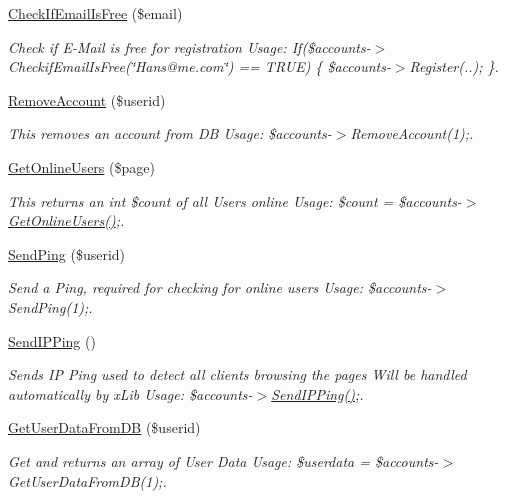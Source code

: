 \begin{DoxyCompactItemize}
\hyperlink{class_u_e4_a_m___account_handler_a64d6faff7acdf23772820fb5a54b53b1}{Check\-If\-Email\-Is\-Free} (\$email)
\begin{DoxyCompactList}\small\item\em Check if E-\/\-Mail is free for registration Usage\-: If(\$accounts-\/$>$Checkif\-Email\-Is\-Free(\char`\"{}\-Hans@me.\-com\char`\"{}) == T\-R\-U\-E) \{ \$accounts-\/$>$Register(..); \}. \end{DoxyCompactList}\item 
\hyperlink{class_u_e4_a_m___account_handler_a24079ae9534790d1f6b99cd1ea184a63}{Remove\-Account} (\$userid)
\begin{DoxyCompactList}\small\item\em This removes an account from D\-B Usage\-: \$accounts-\/$>$Remove\-Account(1);. \end{DoxyCompactList}\item 
\hyperlink{class_u_e4_a_m___account_handler_acd1ece5e2413a2422d27e6ce768f767e}{Get\-Online\-Users} (\$page)
\begin{DoxyCompactList}\small\item\em This returns an int \$count of all Users online Usage\-: \$count = \$accounts-\/$>$\hyperlink{class_u_e4_a_m___account_handler_acd1ece5e2413a2422d27e6ce768f767e}{Get\-Online\-Users()};. \end{DoxyCompactList}\item 
\hyperlink{class_u_e4_a_m___account_handler_a1908680a6760b1256fb20959f0d11ae7}{Send\-Ping} (\$userid)
\begin{DoxyCompactList}\small\item\em Send a Ping, required for checking for online users Usage\-: \$accounts-\/$>$Send\-Ping(1);. \end{DoxyCompactList}\item 
\hyperlink{class_u_e4_a_m___account_handler_a36c70407684b1436a2f5e56deb0c7953}{Send\-I\-P\-Ping} ()
\begin{DoxyCompactList}\small\item\em Sends I\-P Ping used to detect all clients browsing the pages Will be handled automatically by x\-Lib Usage\-: \$accounts-\/$>$\hyperlink{class_u_e4_a_m___account_handler_a36c70407684b1436a2f5e56deb0c7953}{Send\-I\-P\-Ping()};. \end{DoxyCompactList}\item 
\hyperlink{class_u_e4_a_m___account_handler_ad77529ce7c6e199ee187c5ab1ad6088b}{Get\-User\-Data\-From\-D\-B} (\$userid)
\begin{DoxyCompactList}\small\item\em Get and returns an array of User Data Usage\-: \$userdata = \$accounts-\/$>$Get\-User\-Data\-From\-D\-B(1);. \end{DoxyCompactList}\item 

\end{DoxyCompactItemize}
